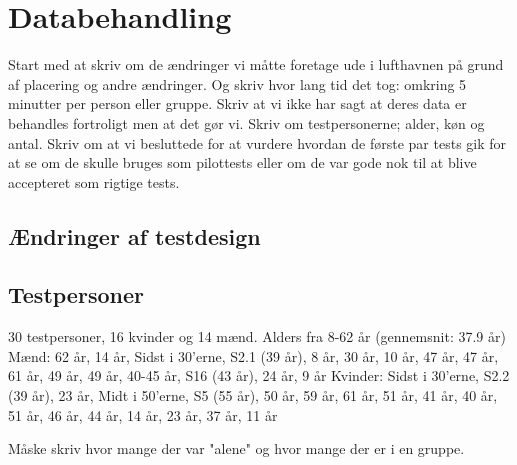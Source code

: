 \chapter{Databehandling}
\label{ParametreDatabehandling}
%
Start med at skriv om de ændringer vi måtte foretage ude i lufthavnen på grund af placering og andre ændringer. Og skriv hvor lang tid det tog: omkring 5 minutter per person eller gruppe. Skriv at vi ikke har sagt at deres data er behandles fortroligt men at det gør vi.  Skriv om testpersonerne; alder, køn og antal. Skriv om at vi besluttede for at vurdere hvordan de første par tests gik for at se om de skulle bruges som pilottests eller om de var gode nok til at blive accepteret som rigtige tests. 

\section{Ændringer af testdesign}
\label{ParametreTestdesign}
%


\section{Testpersoner}
\label{ParametreTestpersoner}
%

30 testpersoner, 16 kvinder og 14 mænd. Alders fra 8-62 år (gennemsnit: 37.9 år)
Mænd: 62 år, 14 år, Sidst i 30'erne, S2.1 (39 år), 8 år, 30 år, 10 år, 47 år, 47 år, 61 år, 49 år, 49 år, 40-45 år, S16 (43 år), 24 år, 9 år
Kvinder: Sidst i 30'erne, S2.2 (39 år), 23 år, Midt i 50'erne, S5 (55 år), 50 år, 59 år, 61 år, 51 år, 41 år, 40 år, 51 år, 46 år, 44 år, 14 år, 23 år, 37 år, 11 år


Måske skriv hvor mange der var "alene" og hvor mange der er i en gruppe. 



